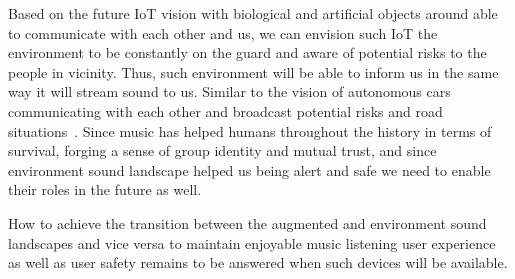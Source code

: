 \documentclass[sigchi]{acmart}
\begin{document}
Based on the future IoT vision with biological and artificial objects around able to communicate with each other and us, we can envision such IoT the environment to be constantly on the guard and aware of potential risks to the people in vicinity. Thus, such environment will be able to inform us in the same way it will stream sound to us. Similar to the vision of autonomous cars communicating with each other and broadcast potential risks and road situations~\cite{shankland20195gcars}. Since music has helped humans throughout the history in terms of survival, forging a sense of group identity and mutual trust, and since environment sound landscape helped us being alert and safe we need to enable their roles in the future as well. 

How to achieve the transition between the augmented and environment sound landscapes and vice versa to maintain enjoyable music listening user experience as well as user safety remains to be answered when such devices will be available. 






\end{document}
